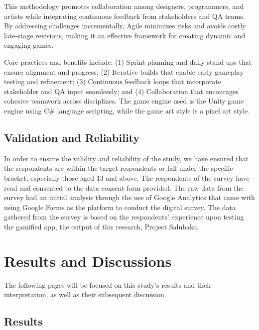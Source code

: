 \documentclass{research}
\begin{document}
This methodology promotes collaboration among designers, programmers, and artists while
integrating continuous feedback from stakeholders and QA teams. By addressing challenges
incrementally, Agile minimizes risks and avoids costly late-stage revisions, making it
an effective framework for creating dynamic and engaging games.

Core practices and benefits include: (1) Sprint planning and daily stand-ups that
ensure alignment and progress; (2) Iterative builds that enable early gameplay testing
and refinement; (3) Continuous feedback loops that incorporate stakeholder and QA input
seamlessly; and (4) Collaboration that encourages cohesive teamwork across disciplines.
The game engine used is the Unity game engine using C\# language scripting, while the
game art style is a pixel art style.

\section{Validation and Reliability}

In order to ensure the validity and reliability of the study, we have ensured that the respondents are within the target respondents or fall under the specific bracket, especially those aged 13 and above. The respondents of the survey have read and consented to the data consent form provided. The raw data from the survey had an initial analysis through the use of Google Analytics that came with using Google Forms as the platform to conduct the digital survey. The data gathered from the survey is based on the respondents’ experience upon testing the gamified app, the output of this research, Project Salubako. 

\clearpage

\chapter{Results and Discussions}

The following pages will be focused on this study's results and their interpretation,
as well as their subsequent discussion.

\section{Results}
\end{document}
